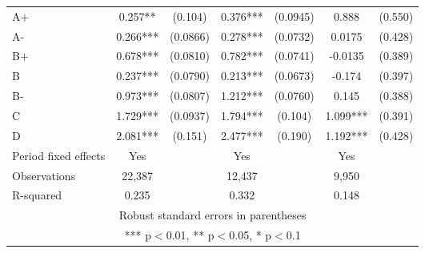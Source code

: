 \documentclass[12pt]{article}
\begin{document}
\begin{table}[H]
{\begin{tabular}{lcccccc}
    A+ & 0.257** & (0.104) & 0.376*** & (0.0945) & 0.888 & (0.550) \\
    A- & 0.266*** & (0.0866) & 0.278*** & (0.0732) & 0.0175 & (0.428) \\
    B+ & 0.678*** & (0.0810) & 0.782*** & (0.0741) & -0.0135 & (0.389) \\
    B & 0.237*** & (0.0790) & 0.213*** & (0.0673) & -0.174 & (0.397) \\
    B- & 0.973*** & (0.0807) & 1.212*** & (0.0760) & 0.145 & (0.388) \\
    C & 1.729*** & (0.0937) & 1.794*** & (0.104) & 1.099*** & (0.391) \\
    D & 2.081*** & (0.151) & 2.477*** & (0.190) & 1.192*** & (0.428) \\
    \midrule
    Period fixed effects & Yes & & Yes & & Yes & \\
    Observations & 22,387 & & 12,437 & & 9,950 & \\
    R-squared & 0.235 & & 0.332 & & 0.148 & \\
    \bottomrule
    \multicolumn{7}{c}{Robust standard errors in parentheses} \\
    \multicolumn{7}{c}{*** p$<$0.01, ** p$<$0.05, * p$<$0.1} \\
    \end{tabular}%
    }
\end{table}
\end{document}
